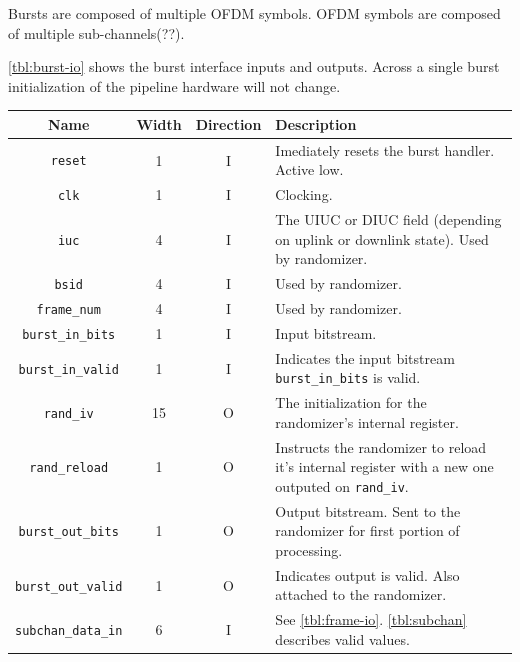 \documentclass[dvips,10pt,twocolumn]{article}
\newcommand{\wire}{\texttt}
\begin{document}
Bursts are composed of multiple OFDM symbols. OFDM symbols are composed of
multiple sub-channels(??). 

\autoref{tbl:burst-io} shows the burst interface inputs and outputs.
Across a single burst initialization of the pipeline hardware will not
change.

\begin{table} \begin{tabularx}{\textwidth}{c|c|c|X}
	\label{tbl:burst-io}
	Name & Width & Direction & Description \\ \hline
	
	\wire{reset} & 1 & I & Imediately resets the burst handler. Active
	low. \\

	\wire{clk} & 1 & I & Clocking. \\

	\wire{iuc} & 4 & I & The UIUC or DIUC field (depending on uplink
	or downlink state). Used by randomizer. \\
	
	\wire{bsid} & 4 & I & Used by randomizer. \\
	
	\wire{frame\_num} & 4 & I & Used by randomizer. \\

	\wire{burst\_in\_bits} & 1 & I & Input bitstream. \\

	\wire{burst\_in\_valid} & 1 &  I & Indicates the input bitstream
	\wire{burst\_in\_bits} is valid. \\

	\wire{rand\_iv} & 15 & O & The initialization for
	the randomizer's internal register. \\

	\wire{rand\_reload} & 1 & O & Instructs the randomizer to reload
	it's internal register with a new one outputed on
	\wire{rand\_iv}. \\

	\wire{burst\_out\_bits} & 1 & O & Output bitstream. Sent to the
	randomizer for first portion of processing. \\

	\wire{burst\_out\_valid} & 1 & O & Indicates output is valid.
	Also attached to the randomizer. \\

	\wire{subchan\_data\_in} & 6 & I & See \autoref{tbl:frame-io}.
	\autoref{tbl:subchan} describes valid values. \\


\end{tabularx}
\end{table}
\end{document}
